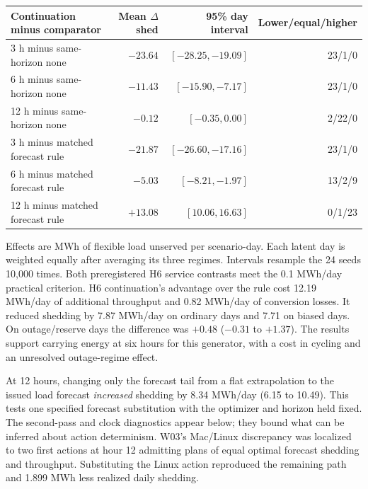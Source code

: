 \documentclass[10pt,letterpaper]{article}
\begin{document}
\begin{center}\small
\begin{tabular}{@{}lrrr@{}}
\toprule
Continuation minus comparator & Mean $\Delta$ shed & 95\% day interval & Lower/equal/higher\\\midrule
3 h minus same-horizon none & $-23.64$ & $[-28.25,-19.09]$ & 23/1/0\\
6 h minus same-horizon none & $-11.43$ & $[-15.90,-7.17]$ & 23/1/0\\
12 h minus same-horizon none & $-0.12$ & $[-0.35,0.00]$ & 2/22/0\\
3 h minus matched forecast rule & $-21.87$ & $[-26.60,-17.16]$ & 23/1/0\\
6 h minus matched forecast rule & $-5.03$ & $[-8.21,-1.97]$ & 13/2/9\\
12 h minus matched forecast rule & $+13.08$ & $[10.06,16.63]$ & 0/1/23\\\bottomrule
\end{tabular}
\end{center}
Effects are MWh of flexible load unserved per scenario-day. Each latent day is weighted equally after averaging its three regimes. Intervals resample the 24 seeds 10,000 times. Both preregistered H6 service contrasts meet the 0.1 MWh/day practical criterion. H6 continuation's advantage over the rule cost 12.19 MWh/day of additional throughput and 0.82 MWh/day of conversion losses. It reduced shedding by 7.87 MWh/day on ordinary days and 7.71 on biased days. On outage/reserve days the difference was $+0.48$ ($-0.31$ to $+1.37$). The results support carrying energy at six hours for this generator, with a cost in cycling and an unresolved outage-regime effect.

At 12 hours, changing only the forecast tail from a flat extrapolation to the issued load forecast \emph{increased} shedding by 8.34 MWh/day (6.15 to 10.49). This tests one specified forecast substitution with the optimizer and horizon held fixed. The second-pass and clock diagnostics appear below; they bound what can be inferred about action determinism. W03's Mac/Linux discrepancy was localized to two first actions at hour 12 admitting plans of equal optimal forecast shedding and throughput. Substituting the Linux action reproduced the remaining path and 1.899 MWh less realized daily shedding.
\end{document}
